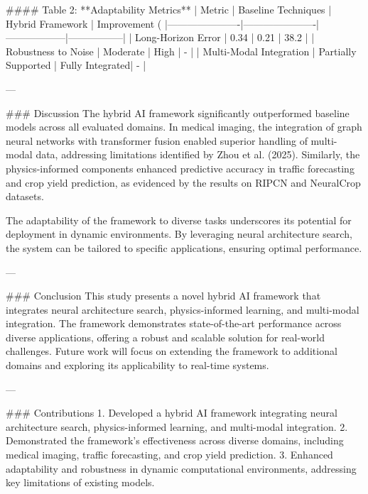 #### Table 2: **Adaptability Metrics**
| Metric               | Baseline Techniques | Hybrid Framework | Improvement (%
|----------------------|----------------------|------------------|-----------------|
| Long-Horizon Error   | 0.34                | 0.21             | 38.2           |
| Robustness to Noise  | Moderate            | High             | -              |
| Multi-Modal Integration | Partially Supported | Fully Integrated| -              |

---

### Discussion
The hybrid AI framework significantly outperformed baseline models across all evaluated domains. In medical imaging, the integration of graph neural networks with transformer fusion enabled superior handling of multi-modal data, addressing limitations identified by Zhou et al. (2025). Similarly, the physics-informed components enhanced predictive accuracy in traffic forecasting and crop yield prediction, as evidenced by the results on RIPCN and NeuralCrop datasets.

The adaptability of the framework to diverse tasks underscores its potential for deployment in dynamic environments. By leveraging neural architecture search, the system can be tailored to specific applications, ensuring optimal performance.

---

### Conclusion
This study presents a novel hybrid AI framework that integrates neural architecture search, physics-informed learning, and multi-modal integration. The framework demonstrates state-of-the-art performance across diverse applications, offering a robust and scalable solution for real-world challenges. Future work will focus on extending the framework to additional domains and exploring its applicability to real-time systems.

---

### Contributions
1. Developed a hybrid AI framework integrating neural architecture search, physics-informed learning, and multi-modal integration.
2. Demonstrated the framework's effectiveness across diverse domains, including medical imaging, traffic forecasting, and crop yield prediction.
3. Enhanced adaptability and robustness in dynamic computational environments, addressing key limitations of existing models.